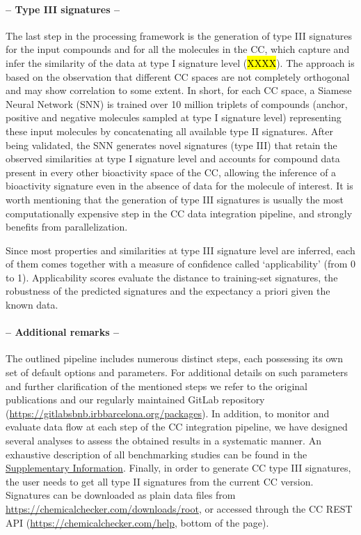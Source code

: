 \paragraph{-- Type III signatures --} \leavevmode


The last step in the processing framework is the generation of type III signatures for the input compounds and for all the molecules in the CC, which capture and infer the similarity of the data at type I signature level (\hl{XXXX}). The approach is based on the observation that different CC spaces are not completely orthogonal and may show correlation to some extent. In short, for each CC space, a Siamese Neural Network (SNN) is trained over 10 million triplets of compounds (anchor, positive and negative molecules sampled at type I signature level) representing these input molecules by concatenating all available type II signatures. After being validated, the SNN generates novel signatures (type III) that retain the observed similarities at type I signature level and accounts for compound data present in every other bioactivity space of the CC, allowing the inference of a bioactivity signature even in the absence of data for the molecule of interest. It is worth mentioning that the generation of type III signatures is usually the most computationally expensive step in the CC data integration pipeline, and strongly benefits from parallelization.

Since most properties and similarities at type III signature level are inferred, each of them comes together with a measure of confidence called ‘applicability’ (from 0 to 1). Applicability scores evaluate the distance to training-set signatures, the robustness of the predicted signatures and the expectancy a priori given the known data. 

\paragraph{-- Additional remarks --} \leavevmode


The outlined pipeline includes numerous distinct steps, each possessing its own set of default options and parameters. For additional details on such parameters and further clarification of the mentioned steps we refer to the original publications\cite{duran-frigola_extending_2020, bertoni_bioactivity_2021} and our regularly maintained GitLab repository (\href{https://gitlabsbnb.irbbarcelona.org/packages}{https://gitlabsbnb.irbbarcelona.org/packages}). In addition, to monitor and evaluate data flow at each step of the CC integration pipeline, we have designed several analyses to assess the obtained results in a systematic manner. An exhaustive description of all benchmarking studies can be found in the \hyperref[Protocols_SupplementaryInformation]{Supplementary Information}. Finally, in order to generate CC type III signatures, the user needs to get all type II signatures from the current CC version. Signatures can be downloaded as plain data files from \href{https://chemicalchecker.com/downloads/root}{https://chemicalchecker.com/downloads/root}, or accessed through the CC REST API (\href{https://chemicalchecker.com/help}{https://chemicalchecker.com/help}, bottom of the page).


